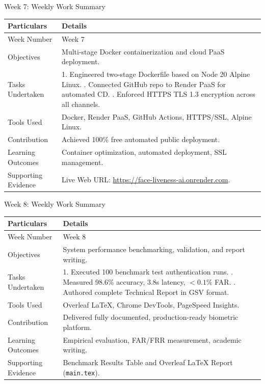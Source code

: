 \documentclass[aspectratio=169, 11pt]{beamer}
\begin{document}
\begin{frame}{Week 7: Weekly Work Summary}
\small
\renewcommand{\arraystretch}{1.2}
\begin{tabular}{|p{3.2cm}|p{8.0cm}|}
\hline
\rowcolor{gray!15} \textbf{Particulars} & \textbf{Details} \\ \hline
Week Number & Week 7 \\ \hline
Objectives & Multi-stage Docker containerization and cloud PaaS deployment. \\ \hline
Tasks Undertaken & 1. Engineered two-stage Dockerfile based on Node 20 Alpine Linux. \newline 2. Connected GitHub repo to Render PaaS for automated CD. \newline 3. Enforced HTTPS TLS 1.3 encryption across all channels. \\ \hline
Tools Used & Docker, Render PaaS, GitHub Actions, HTTPS/SSL, Alpine Linux. \\ \hline
Contribution & Achieved 100\% free automated public deployment. \\ \hline
Learning Outcomes & Container optimization, automated deployment, SSL management. \\ \hline
Supporting Evidence & Live Web URL: \url{https://face-liveness-ai.onrender.com}. \\ \hline
\end{tabular}
\end{frame}

\begin{frame}{Week 8: Weekly Work Summary}
\small
\renewcommand{\arraystretch}{1.2}
\begin{tabular}{|p{3.2cm}|p{8.0cm}|}
\hline
\rowcolor{gray!15} \textbf{Particulars} & \textbf{Details} \\ \hline
Week Number & Week 8 \\ \hline
Objectives & System performance benchmarking, validation, and report writing. \\ \hline
Tasks Undertaken & 1. Executed 100 benchmark test authentication runs. \newline 2. Measured 98.6\% accuracy, 3.8s latency, $<0.1\%$ FAR. \newline 3. Authored complete Technical Report in GSV format. \\ \hline
Tools Used & Overleaf LaTeX, Chrome DevTools, PageSpeed Insights. \\ \hline
Contribution & Delivered fully documented, production-ready biometric platform. \\ \hline
Learning Outcomes & Empirical evaluation, FAR/FRR measurement, academic writing. \\ \hline
Supporting Evidence & Benchmark Results Table and Overleaf LaTeX Report (\texttt{main.tex}). \\ \hline
\end{tabular}
\end{frame}
\end{document}
